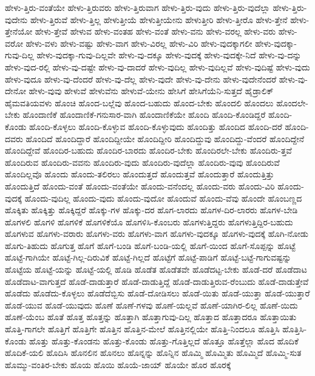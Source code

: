 {ಹೇಳು-ತ್ತಿರು-ವಂತೆಯೇ
ಹೇಳು-ತ್ತಿರುವರು
ಹೇಳು-ತ್ತಿರುವಾಗ
ಹೇಳು-ತ್ತಿರು-ವುದು
ಹೇಳು-ತ್ತಿರು-ವುದೆಲ್ಲಾ
ಹೇಳು-ತ್ತಿರು-ವುದೇನು
ಹೇಳು-ತ್ತಿರುವೆ
ಹೇಳು-ತ್ತಿಲ್ಲ
ಹೇಳುತ್ತೀಯೆ
ಹೇಳುತ್ತೀಯೇನು
ಹೇಳುತ್ತೀರಿ
ಹೇಳು-ತ್ತೀರೊ
ಹೇಳು-ತ್ತೇನೆ
ಹೇಳು-ತ್ತೇನೆಯೋ
ಹೇಳು-ತ್ತೇವೆ
ಹೇಳುವ
ಹೇಳು-ವಂತಹ
ಹೇಳು-ವಂತೆ
ಹೇಳು-ವನು
ಹೇಳು-ವರಲ್ಲ
ಹೇಳು-ವರು
ಹೇಳು-ವರೋ
ಹೇಳು-ವಳು
ಹೇಳು-ವಷ್ಟು
ಹೇಳು-ವಾಗ
ಹೇಳು-ವಿರಲ್ಲ
ಹೇಳು-ವಿರಿ
ಹೇಳು-ವುದಕ್ಕಾಗಲೀ
ಹೇಳು-ವುದಕ್ಕಾ-ಗುವು-ದಿಲ್ಲ
ಹೇಳು-ವುದಕ್ಕಾ-ಗುವು-ದಿಲ್ಲವೇ
ಹೇಳು-ವು-ದಕ್ಕೂ
ಹೇಳು-ವುದಕ್ಕೆ
ಹೇಳು-ವುದಕ್ಕೇ-ನಿದೆ
ಹೇಳು-ವು-ದನ್ನು
ಹೇಳು-ವುದ-ರಲ್ಲಿ
ಹೇಳು-ವು-ದಷ್ಟೇ
ಹೇಳು-ವು-ದಾದರೆ
ಹೇಳು-ವುದಿಲ್ಲ
ಹೇಳು-ವುದಿಲ್ಲವೆ
ಹೇಳು-ವುದಿಷ್ಟೆ
ಹೇಳು-ವುದು
ಹೇಳು-ವುದೂ
ಹೇಳು-ವು-ದೆಂದರೆ
ಹೇಳು-ವು-ದೆಲ್ಲ
ಹೇಳು-ವುದೇ
ಹೇಳು-ವು-ದೇನು
ಹೇಳು-ವುದೇನೆಂದರೆ
ಹೇಳು-ವು-ದೇನೋ
ಹೇಳು-ವುವು
ಹೇಳುವೆ
ಹೇಳುವೆನು
ಹೇಳುವೆ-ಯೇನು
ಹೇಸಿಗೆ
ಹೇಸಿಗೆಯೆನಿ-ಸುತ್ತದೆ
ಹೈಡ್ರಾಲಿಕ್
ಹೈಮವತಿಯವಳು
ಹೊಂಚಿ
ಹೊಂದ-ಬಲ್ಲೆವು
ಹೊಂದ-ಬಹುದು
ಹೊಂದ-ಬೇಕು
ಹೊಂದಲಿ
ಹೊಂದಲು
ಹೊಂದಲೇ-ಬೇಕು
ಹೊಂದಾಣಿಕೆ
ಹೊಂದಾಣಿಕೆ-ಗನುಸಾರ-ವಾಗಿ
ಹೊಂದಾಣಿಕೆಯೇ
ಹೊಂದಿ
ಹೊಂದಿ-ಕೊಂಡಿದ್ದರೆ
ಹೊಂದಿ-ಕೊಂಡು
ಹೊಂದಿ-ಕೊಳ್ಳಲು
ಹೊಂದಿ-ಕೊಳ್ಳುವ
ಹೊಂದಿ-ಕೊಳ್ಳುವುದು
ಹೊಂದಿತ್ತು
ಹೊಂದಿದ
ಹೊಂದಿ-ದರೆ
ಹೊಂದಿ-ದವರು
ಹೊಂದಿದೆ
ಹೊಂದಿದ್ದಾರೆ
ಹೊಂದಿದ್ದೀಯೇ
ಹೊಂದಿದ್ದೀರಿ
ಹೊಂದಿದ್ದುವು
ಹೊಂದಿದ್ದು-ವೆಂದರೆ
ಹೊಂದಿದ್ದೇನೆ
ಹೊಂದಿದ್ದೇವೆ
ಹೊಂದಿರ-ಬಹುದು
ಹೊಂದಿರ-ಬಾರದು
ಹೊಂದಿರ-ಬೇಕು
ಹೊಂದಿರಲೇ-ಬೇಕು
ಹೊಂದಿರು-ತ್ತವೆ
ಹೊಂದಿರುವ
ಹೊಂದಿರು-ವವನು
ಹೊಂದಿರು-ವುದು
ಹೊಂದಿರು-ವುದೆಲ್ಲಾ
ಹೊಂದಿರು-ವುವು
ಹೊಂದಿರುವೆ
ಹೊಂದಿಲ್ಲವೊ
ಹೊಂದು
ಹೊಂದು-ತಲಿರಲು
ಹೊಂದುತ್ತದೆ
ಹೊಂದುತ್ತವೆ
ಹೊಂದುತ್ತಾರೆ
ಹೊಂದುತ್ತಿತ್ತು
ಹೊಂದುತ್ತಿದೆ
ಹೊಂದು-ವಂತೆ
ಹೊಂದು-ವಂತೆಯೇ
ಹೊಂದು-ವನೆಂದಲ್ಲ
ಹೊಂದು-ವರು
ಹೊಂದು-ವಿರಿ
ಹೊಂದು-ವುದಕ್ಕೆ
ಹೊಂದು-ವುದಿಲ್ಲ
ಹೊಂದು-ವುದು
ಹೊಂದು-ವುದೋ
ಹೊಂದುವೆ
ಹೊಂದು-ವೆವು
ಹೊಂದೇ
ಹೊಂಬಣ್ಣದ
ಹೊಕ್ಕಿತು
ಹೊಕ್ಕಿತ್ತು
ಹೊಕ್ಕಿದ್ದರೆ
ಹೊಕ್ಕು-ಗಳ
ಹೊಕ್ಕು-ದರ
ಹೊಗ-ಲಾರದು
ಹೊಗಳ-ದಿರ-ಲಾರರು
ಹೊಗಳ-ಬೇಡಿ
ಹೊಗಳಲಿ
ಹೊಗಳಿ
ಹೊಗಳಿಕೆ
ಹೊಗಳಿಕೆಯೊ
ಹೊಗಳಿಸಿ-ಕೊಂಬರು
ಹೊಗಳುತ್ತಿದ್ದರು
ಹೊಗಳುತ್ತಿದ್ದಿರ-ಬಹುದು
ಹೊಗಳುವ
ಹೊಗಳು-ವರಾರು
ಹೊಗಳು-ವರು
ಹೊಗಳು-ವಾಗ
ಹೊಗಳು-ವುದಕ್ಕೂ
ಹೊಗಳು-ವುದಕ್ಕೆ
ಹೊಗಿ-ನೋಡು
ಹೊಗು-ತಿಹುದು
ಹೊಗುತ್ತ
ಹೊಗೆ
ಹೊಗೆ-ಬಂಡಿ
ಹೊಗೆ-ಬಂಡಿ-ಯಲ್ಲಿ
ಹೊಗೆ-ಯಿಂದ
ಹೊಗೆ-ಸೊಪ್ಪನ್ನು
ಹೊಟ್ಟೆ
ಹೊಟ್ಟೆ-ಗಾಗಿಯೇ
ಹೊಟ್ಟೆ-ಗಿಲ್ಲ-ದಿರುವಿಕೆ
ಹೊಟ್ಟೆ-ಗಿಲ್ಲದೆ
ಹೊಟ್ಟೆಗೆ
ಹೊಟ್ಟೆ-ಪಾಡಿಗೆ
ಹೊಟ್ಟೆ-ಬಟ್ಟೆ-ಗಾಗುವಷ್ಟನ್ನು
ಹೊಟ್ಟೆಯ
ಹೊಟ್ಟೆ-ಯನ್ನು
ಹೊಟ್ಟೆ-ಯಲ್ಲಿ
ಹೊಡಿ
ಹೊಡೆತ
ಹೊಡೆತವೇ
ಹೊಡೆದಟ್ಟ-ಬೇಕು
ಹೊಡೆ-ದರೆ
ಹೊಡೆದಾಟ
ಹೊಡೆದಾಟ-ವಾಗುತ್ತದೆ
ಹೊಡೆ-ದಾಡುತ್ತಾರೆ
ಹೊಡೆ-ದಾಡುತ್ತಿದ್ದೆ
ಹೊಡೆ-ದಾಡುತ್ತಿರುವ-ರೆಂಬುದು
ಹೊಡೆ-ದಾಡುತ್ತೇವೆ
ಹೊಡೆದು
ಹೊಡೆದು-ಕೊಳ್ಳಲು
ಹೊಡೆದೆಬ್ಬಿಸು
ಹೊಡೆ-ದೋಡಿಸಲು
ಹೊಡೆ-ಯಿತು
ಹೊಡೆ-ಯುತ್ತಾ
ಹೊಡೆ-ಯುತ್ತಾರೆ
ಹೊಡೆ-ಯುವ
ಹೊಡೆ-ಯುವುದು
ಹೊಣೆ
ಹೊಣೆ-ಗಳವು
ಹೊಣೆ-ಯಲ್ಲವೆ
ಹೊಣೆ-ಯಾಗಿರ-ಲಿಲ್ಲ
ಹೊಣೆ-ಯಿದು
ಹೊಣೆ-ಯೆಂಬ
ಹೊತೆ
ಹೊತ್ತ
ಹೊತ್ತನ್ನು
ಹೊತ್ತಾಗಿ
ಹೊತ್ತಾಗುವು-ದಿಲ್ಲ
ಹೊತ್ತಾದ
ಹೊತ್ತಾದರೂ
ಹೊತ್ತಾಯಿತು
ಹೊತ್ತಿ-ಗಾಗಲೇ
ಹೊತ್ತಿಗೆ
ಹೊತ್ತಿಗೇ
ಹೊತ್ತಿನ
ಹೊತ್ತಿನ-ಮೇಲೆ
ಹೊತ್ತಿನಲ್ಲಿಯೇ
ಹೊತ್ತಿ-ನಿಂದಲೂ
ಹೊತ್ತಿಸಿ
ಹೊತ್ತಿಸಿ-ಕೊಂಡು
ಹೊತ್ತು
ಹೊತ್ತು-ಕೊಂಡನು
ಹೊತ್ತು-ಕೊಂಡು
ಹೊತ್ತು-ಗೊತ್ತಿಲ್ಲದೆ
ಹೊತ್ತೂ
ಹೊತ್ತೆಲ್ಲಾ
ಹೊದ
ಹೊದಿಕೆ
ಹೊದಿಕೆ-ಯಲಿ
ಹೊದಿಸಿ
ಹೊನಲಿನ
ಹೊನಲು
ಹೊನ್ನನ್ನು
ಹೊನ್ನಿನ
ಹೊಮ್ಮಿ
ಹೊಮ್ಮಿತು
ಹೊಮ್ಮಿದೆ
ಹೊಮ್ಮಿ-ಸುತ
ಹೊಮ್ಮು-ವಂತಿರ-ಬೇಕು
ಹೊಯ
ಹೊಯಿ
ಹೊಯೆ-ಜಾಯ್
ಹೊಯೇ
ಹೊರ
ಹೊರಕ್ಕೆ
}
